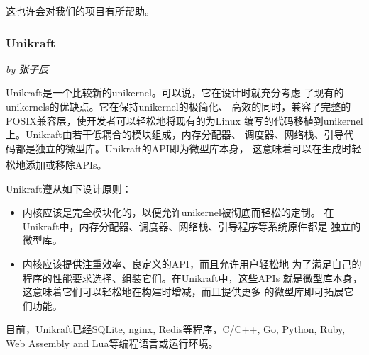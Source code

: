 \documentclass[UTF8,fontset=none,linespread=1.15]{ctexart}
\let\nosupcite\cite
\renewcommand*{\cite}[1]{\textsuperscript{\nosupcite{#1}}}
\newcommand{\sectionauthor}[1]{%
\vspace*{-5ex}
\noindent\textrm{\hfill\textit{by #1}}
\vspace*{2ex}\par}
\begin{document}
这也许会对我们的项目有所帮助。

\subsubsection{Unikraft}\sectionauthor{张子辰}
Unikraft是一个比较新的unikernel。可以说，它在设计时就充分考虑
了现有的unikernels的优缺点。它在保持unikernel的极简化、
高效的同时，兼容了完整的POSIX兼容层，使开发者可以轻松地将现有的为Linux
编写的代码移植到unikernel上。Unikraft由若干低耦合的模块组成，内存分配器、
调度器、网络栈、引导代码都是独立的微型库。Unikraft的API即为微型库本身，
这意味着可以在生成时轻松地添加或移除APIs。\cite{bib:unikraft}

Unikraft遵从如下设计原则：
\begin{itemize}
\item 内核应该是完全模块化的，以便允许unikernel被彻底而轻松的定制。
在Unikraft中，内存分配器、调度器、网络栈、引导程序等系统原件都是
独立的微型库。
\item 内核应该提供注重效率、良定义的API，而且允许用户轻松地
为了满足自己的程序的性能要求选择、组装它们。在Unikraft中，这些APIs
就是微型库本身，这意味着它们可以轻松地在构建时增减，而且提供更多
的微型库即可拓展它们功能。
\end{itemize}

目前，Unikraft已经SQLite, nginx, Redis等程序，C/C++, Go, Python, Ruby,
Web Assembly and Lua等编程语言或运行环境。
\end{document}
